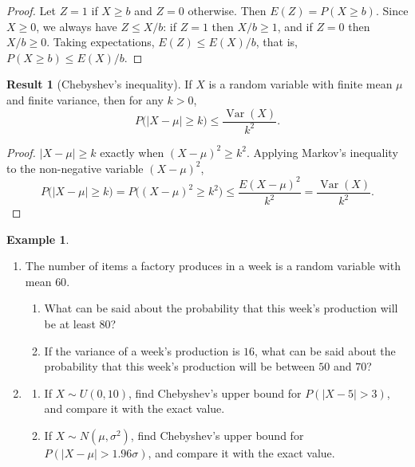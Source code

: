 \documentclass[11pt,a4paper]{article}
\theoremstyle{definition}
\newtheorem{exa}[thm]{Example}
\newtheorem{result}[thm]{Result}
\DeclareMathOperator{\Var}{Var}
\begin{document}
\begin{proof}
Let $Z = 1$ if $X \ge b$ and $Z = 0$ otherwise. Then $E(Z) = P(X \ge b)$. Since $X \ge 0$, we always have $Z \le X/b$: if $Z = 1$ then $X/b \ge 1$, and if $Z = 0$
then $X/b \ge 0$. Taking expectations, $E(Z) \le E(X)/b$, that is, $P(X \ge b) \le E(X)/b$.
\end{proof}

\begin{result}[Chebyshev's inequality]\label{res:chebyshev}
If $X$ is a random variable with finite mean $\mu$ and finite variance, then for any $k > 0$,
\[
P\bigl(|X - \mu| \ge k\bigr) \le \frac{\Var(X)}{k^2} .
\]
\end{result}

\begin{proof}
$|X - \mu| \ge k$ exactly when $(X - \mu)^2 \ge k^2$. Applying Markov's inequality to the non-negative variable $(X - \mu)^2$,
\[
P\bigl(|X - \mu| \ge k\bigr) = P\bigl((X - \mu)^2 \ge k^2\bigr) \le \frac{E(X - \mu)^2}{k^2} = \frac{\Var(X)}{k^2} .
\]
\end{proof}

\begin{exa}\label{exa:factory}
\begin{enumerate}[label=(\alph*)]
\item The number of items a factory produces in a week is a random variable with mean $60$.
\begin{enumerate}[label=(\roman*)]
\item What can be said about the probability that this week's production will be at least $80$?
\item If the variance of a week's production is $16$, what can be said about the probability that this week's production will be
between $50$ and $70$?
\end{enumerate}
\item
\begin{enumerate}[label=(\roman*)]
\item If $X \sim U(0, 10)$, find Chebyshev's upper bound for $P(|X - 5| > 3)$, and compare it with the exact value.
\item If $X \sim N(\mu, \sigma^2)$, find Chebyshev's upper bound for $P(|X - \mu| > 1.96\sigma)$, and compare it with the exact value.
\end{enumerate}
\end{enumerate}
\end{exa}
\end{document}
